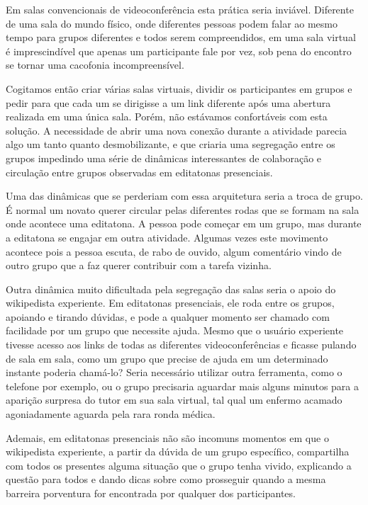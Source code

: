 Em salas convencionais de videoconferência esta prática seria inviável. Diferente de uma sala do mundo físico, onde diferentes pessoas podem falar ao mesmo tempo para grupos diferentes e todos serem compreendidos, em uma sala virtual é imprescindível que apenas um participante fale por vez, sob pena do encontro se tornar uma cacofonia incompreensível.

Cogitamos então criar várias salas virtuais, dividir os participantes em grupos e pedir para que cada um se dirigisse a um link diferente após uma abertura realizada em uma única sala. Porém, não estávamos confortáveis com esta solução. A necessidade de abrir uma nova conexão durante a atividade parecia algo um tanto quanto desmobilizante, e que criaria uma segregação entre os grupos impedindo uma série de dinâmicas interessantes de colaboração e circulação entre grupos observadas em editatonas presenciais.

Uma das dinâmicas que se perderiam com essa arquitetura seria a troca de grupo. É normal um novato querer circular pelas diferentes rodas que se formam na sala onde acontece uma editatona. A pessoa pode começar em um grupo, mas durante a editatona se engajar em outra atividade. Algumas vezes este movimento acontece pois a pessoa escuta, de rabo de ouvido, algum comentário vindo de outro grupo que a faz querer contribuir com a tarefa vizinha.

Outra dinâmica muito dificultada pela segregação das salas seria o apoio do wikipedista experiente. Em editatonas presenciais, ele roda entre os grupos, apoiando e tirando dúvidas, e pode a qualquer momento ser chamado com facilidade por um grupo que necessite ajuda. Mesmo que o usuário experiente tivesse acesso aos links de todas as diferentes videoconferências e ficasse pulando de sala em sala, como um grupo que precise de ajuda em um determinado instante poderia chamá-lo? Seria necessário utilizar outra ferramenta, como o telefone por exemplo, ou o grupo precisaria aguardar mais alguns minutos para a aparição surpresa do tutor em sua sala virtual, tal qual um enfermo acamado agoniadamente aguarda pela rara ronda médica.

Ademais, em editatonas presenciais não são incomuns momentos em que o wikipedista experiente, a partir da dúvida de um grupo específico, compartilha com todos os presentes alguma situação que o grupo tenha vivido, explicando a questão para todos e dando dicas sobre como prosseguir quando a mesma barreira porventura for encontrada por qualquer dos participantes.

